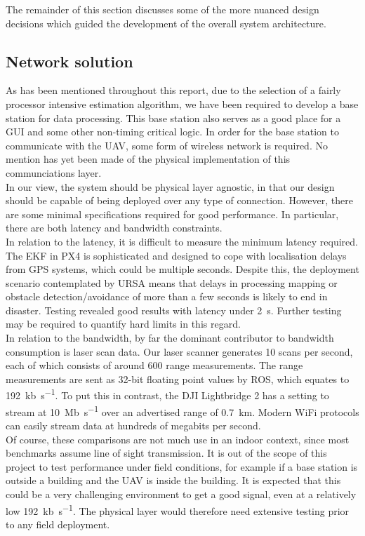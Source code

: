\documentclass[capstone_report.tex]{subfiles}
\begin{document}
	The remainder of this section discusses some of the more nuanced design decisions which guided the development of the overall system architecture.

	\subsection{Network solution}
	As has been mentioned throughout this report, due to the selection of a fairly processor intensive estimation algorithm, we have been required to develop a base station for data processing. This base station also serves as a good place for a GUI and some other non-timing critical logic. In order for the base station to communicate with the UAV, some form of wireless network is required. No mention has yet been made of the physical implementation of this communciations layer.\\

	In our view, the system should be physical layer agnostic, in that our design should be capable of being deployed over any type of connection. However, there are some minimal specifications required for good performance. In particular, there are both latency and bandwidth constraints.\\ 

	In relation to the latency, it is difficult to measure the minimum latency required. The EKF in PX4 is sophisticated and designed to cope with localisation delays from GPS systems, which could be multiple seconds. Despite this, the deployment scenario contemplated by URSA means that delays in processing mapping or obstacle detection/avoidance of more than a few seconds is likely to end in disaster. Testing revealed good results with latency under \SI{2}{\second}. Further testing may be required to quantify hard limits in this regard.\\

	In relation to the bandwidth, by far the dominant contributor to bandwidth consumption is laser scan data. Our laser scanner generates 10 scans per second, each of which consists of around 600 range measurements. The range measurements are sent as 32-bit floating point values by ROS, which equates to \SI{192}{\kilo b\per\second}. To put this in contrast, the DJI Lightbridge 2 has a setting to stream at \SI{10}{\mega b\per\second} over an advertised range of \SI{0.7}{\kilo\meter}. Modern WiFi protocols can easily stream data at hundreds of megabits per second.\\

	Of course, these comparisons are not much use in an indoor context, since most benchmarks assume line of sight transmission. It is out of the scope of this project to test performance under field conditions, for example if a base station is outside a building and the UAV is inside the building. It is expected that this could be a very challenging environment to get a good signal, even at a relatively low \SI{192}{\kilo b\per\second}. The physical layer would therefore need extensive testing prior to any field deployment. \\
\end{document}
